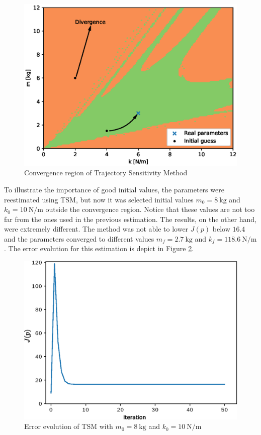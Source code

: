 \begin{figure}[h]
	\caption{Convergence region of Trajectory Sensitivity Method}
	\begin{center}
		\includegraphics[scale=0.6]{Images/convergence_region.eps}
	\end{center}
	\label{fig: conv_reg}
\end{figure}

To illustrate the importance of good initial values, the parameters were reestimated using TSM, but now it was selected initial values $m_{0} = 8\ \text{kg}$ and $k_{0} = 10\ \text{N/m}$ outside the convergence region. Notice that these values are not too far from the ones used in the previous estimation. The results, on the other hand, were extremely different. The method was not able to lower $J(p)$ below $16.4$ and the parameters converged to different values $m_{f} = 2.7\ \text{kg}$ and $k_{f} = 118.6\ \text{N/m}$. The error evolution for this estimation is depict in Figure \ref{fig: TS_nconv}.

\begin{figure}[h]
	\caption{Error evolution of TSM with $m_{0} = 8\ \text{kg}$ and $k_{0} = 10\ \text{N/m}$}
	\begin{center}
		\includegraphics[scale=0.6]{Images/TS_nconv.eps}
	\end{center}
	\label{fig: TS_nconv}
\end{figure}

